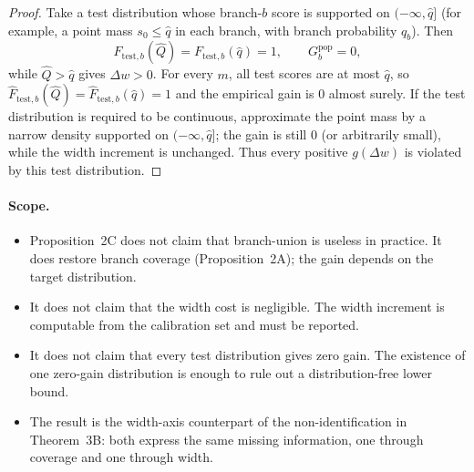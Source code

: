 \begin{proof}
Take a test distribution whose branch-$b$ score is supported on
$(-\infty,\hat q]$ (for example, a point mass $s_0\le\hat q$ in each
branch, with branch probability $q_b$).  Then
\[
F_{\mathrm{test},b}(\hat Q)
=F_{\mathrm{test},b}(\hat q)=1,
\qquad
G_b^{\mathrm{pop}}=0,
\]
while $\hat Q>\hat q$ gives $\Delta w>0$.  For every $m$, all test
scores are at most $\hat q$, so
$\hat F_{\mathrm{test},b}(\hat Q)
=\hat F_{\mathrm{test},b}(\hat q)=1$ and the empirical gain is $0$
almost surely.  If the test distribution is required to be continuous,
approximate the point mass by a narrow density supported on
$(-\infty,\hat q]$; the gain is still $0$ (or arbitrarily small), while
the width increment is unchanged.  Thus every positive $g(\Delta w)$ is
violated by this test distribution.
\end{proof}

\paragraph{Scope.}
\begin{itemize}
\item Proposition~2C does not claim that branch-union is useless in
practice.  It does restore branch coverage (Proposition~2A); the gain
depends on the target distribution.
\item It does not claim that the width cost is negligible.  The width
increment is computable from the calibration set and must be reported.
\item It does not claim that every test distribution gives zero gain.
The existence of one zero-gain distribution is enough to rule out a
distribution-free lower bound.
\item The result is the width-axis counterpart of the non-identification
in Theorem~3B: both express the same missing information, one through
coverage and one through width.
\end{itemize}

\let\theHequation\aVtheHequation
